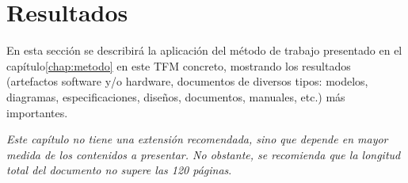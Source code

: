 \chapter{Resultados}
\label{chap:resultados}

\noindent
En esta sección se describirá la aplicación del método de trabajo presentado en
el capítulo\ref{chap:metodo} en este TFM concreto, mostrando los resultados
(artefactos software y/o hardware, documentos de diversos tipos: modelos,
diagramas, especificaciones, diseños, documentos, manuales, etc.) más
importantes.

\emph{Este capítulo no tiene una extensión recomendada, sino que depende en
  mayor medida de los contenidos a presentar. No obstante, se recomienda que la
  longitud total del documento no supere las 120 páginas}.
